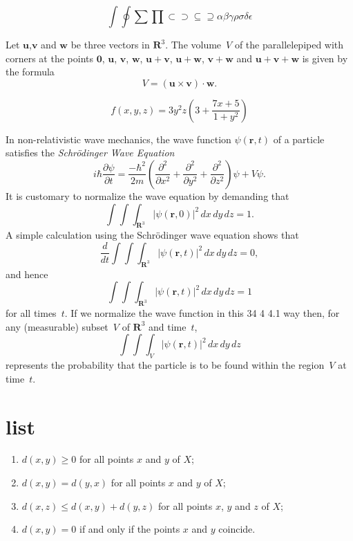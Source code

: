\documentclass[a4paper,12pt]{msty}
\begin{document}
\begin{equation}
\int \oint \sum \prod \subset \supset \subseteq \supseteq \alpha \beta \gamma \rho \sigma \delta \epsilon
\end{equation}

Let $\mathbf{u}$,$\mathbf{v}$ and $\mathbf{w}$ be three
vectors in ${\mathbf R}^3$. The volume~$V$ of the
parallelepiped with corners at the points
$\mathbf{0}$, $\mathbf{u}$, $\mathbf{v}$,
$\mathbf{w}$, $\mathbf{u}+\mathbf{v}$,
$\mathbf{u}+\mathbf{w}$, $\mathbf{v}+\mathbf{w}$
and $\mathbf{u}+\mathbf{v}+\mathbf{w}$
is given by the formula
\[ V = (\mathbf{u} \times \mathbf{v}) \cdot \mathbf{w}.\]

\begin{equation}
f(x,y,z) = 3y^2 z \left( 3 + \frac{7x+5}{1 + y^2} \right)
\end{equation}


In non-relativistic wave mechanics, the wave function
     $\psi(\mathbf{r},t)$ of a particle satisfies the
     \textit{Schr\"{o}dinger Wave Equation}
     \[ i\hbar\frac{\partial \psi}{\partial t}
       = \frac{-\hbar^2}{2m} \left(
         \frac{\partial^2}{\partial x^2}
         + \frac{\partial^2}{\partial y^2}
         + \frac{\partial^2}{\partial z^2}
       \right) \psi + V \psi.\]
     It is customary to normalize the wave equation by
     demanding that
     \[ \int \!\!\! \int \!\!\! \int_{\textbf{R}^3}
           \left| \psi(\mathbf{r},0) \right|^2\,dx\,dy\,dz = 1.\]
     A simple calculation using the Schr\"{o}dinger wave
     equation shows that
     \[ \frac{d}{dt} \int \!\!\! \int \!\!\! \int_{\textbf{R}^3}
           \left| \psi(\mathbf{r},t) \right|^2\,dx\,dy\,dz = 0,\]
     and hence
     \[ \int \!\!\! \int \!\!\! \int_{\textbf{R}^3}
           \left| \psi(\mathbf{r},t) \right|^2\,dx\,dy\,dz = 1\]
     for all times~$t$. If we normalize the wave function in this
34
4 4.1
way then, for any (measurable) subset~$V$ of $\textbf{R}^3$
and time~$t$,
\[ \int \!\!\! \int \!\!\! \int_V
      \left| \psi(\mathbf{r},t) \right|^2\,dx\,dy\,dz\]
represents the probability that the particle is to be found
within the region~$V$ at time~$t$.

\section{list}

\begin{enumerate}
\item
$d(x,y) \geq 0$ for all points $x$ and $y$ of $X$;
\item
$d(x,y) = d(y,x)$ for all points $x$ and $y$ of $X$;
\item
$d(x,z) \leq d(x,y) + d(y,z)$ for all points $x$, $y$
and $z$ of $X$;
\item
$d(x,y) = 0$ if and only if the points $x$ and $y$
coincide.
\end{enumerate}
\end{document}
